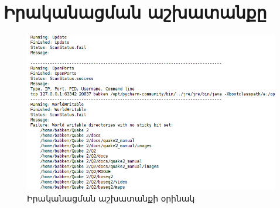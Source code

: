 \documentclass[a4paper,12pt]{article}
\begin{document}
\begin{sloppypar}
























\end{sloppypar}


\newpage
\section*{Իրականացման աշխատանքը}


\begin{figure}[h!]
  \caption{Իրականացման աշխատանքի օրինակ}
  \centering
    \includegraphics[width=1.0\textwidth]{result.png}
\end{figure}
\end{document}
